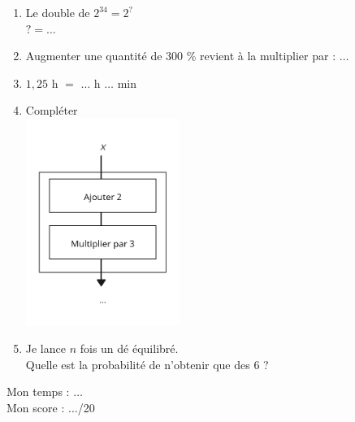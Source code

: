 \documentclass[a4paper,11pt,landscape,exos]{nsi} %
\begin{document}
\begin{multicols}{2}
\begin{enumerate}[itemsep=1em]
	\item Le double  de $2^{34}=2^?$\\$?=\ldots$
	\item Augmenter une quantité de $300$ \% revient à la multiplier par : $\ldots$
	\item $1,25$ h $=$ $\ldots$ h $\ldots$ min
	\item Compléter\\ \includegraphics[width=5cm]{Can3.png}
	\item Je lance $n$ fois un dé équilibré.\\
    Quelle est la probabilité de n'obtenir que des 6 ?
\end{enumerate}
\vfill\null
\columnbreak
Mon temps : $\ldots$\\[.5em]
Mon score : $\ldots$/20
\end{multicols}
\newpage
\end{document}
